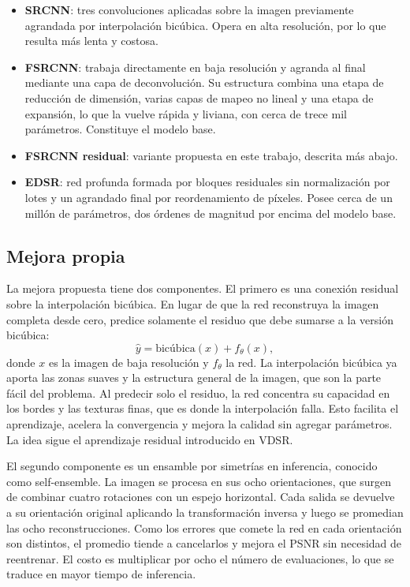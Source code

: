 \documentclass[conference]{IEEEtran}
\begin{document}
\begin{itemize}
  \item \textbf{SRCNN}: tres convoluciones aplicadas sobre la imagen previamente agrandada por
  interpolación bicúbica. Opera en alta resolución, por lo que resulta más lenta y costosa.
  \item \textbf{FSRCNN}: trabaja directamente en baja resolución y agranda al final mediante una
  capa de deconvolución. Su estructura combina una etapa de reducción de dimensión, varias capas
  de mapeo no lineal y una etapa de expansión, lo que la vuelve rápida y liviana, con cerca de
  trece mil parámetros. Constituye el modelo base.
  \item \textbf{FSRCNN residual}: variante propuesta en este trabajo, descrita más abajo.
  \item \textbf{EDSR}: red profunda formada por bloques residuales sin normalización por lotes y
  un agrandado final por reordenamiento de píxeles. Posee cerca de un millón de parámetros, dos
  órdenes de magnitud por encima del modelo base.
\end{itemize}

\subsection{Mejora propia}
La mejora propuesta tiene dos componentes. El primero es una conexión residual sobre la
interpolación bicúbica. En lugar de que la red reconstruya la imagen completa desde cero, predice
solamente el residuo que debe sumarse a la versión bicúbica:
\begin{equation}
\hat{y} = \text{bicúbica}(x) + f_\theta(x),
\end{equation}
donde $x$ es la imagen de baja resolución y $f_\theta$ la red. La interpolación bicúbica ya aporta
las zonas suaves y la estructura general de la imagen, que son la parte fácil del problema. Al
predecir solo el residuo, la red concentra su capacidad en los bordes y las texturas finas, que es
donde la interpolación falla. Esto facilita el aprendizaje, acelera la convergencia y mejora la
calidad sin agregar parámetros. La idea sigue el aprendizaje residual introducido en VDSR.

El segundo componente es un ensamble por simetrías en inferencia, conocido como self-ensemble. La
imagen se procesa en sus ocho orientaciones, que surgen de combinar cuatro rotaciones con un
espejo horizontal. Cada salida se devuelve a su orientación original aplicando la transformación
inversa y luego se promedian las ocho reconstrucciones. Como los errores que comete la red en cada
orientación son distintos, el promedio tiende a cancelarlos y mejora el PSNR sin necesidad de
reentrenar. El costo es multiplicar por ocho el número de evaluaciones, lo que se traduce en mayor
tiempo de inferencia.
\end{document}
